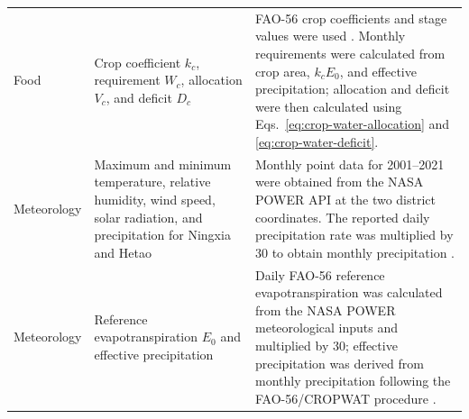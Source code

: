 \documentclass [a4paper,fleqn] {cas-dc}
\begin{document}
\begin{xltabular}{\textwidth}{@{}>{\raggedright\arraybackslash}p{0.09\textwidth}
  >{\raggedright\arraybackslash}p{0.24\textwidth}
  >{\raggedright\arraybackslash}X@{}}
Food & Crop coefficient $k_c$, requirement $W_c$, allocation $V_c$, and deficit
$D_c$ & FAO-56 crop coefficients and stage values were used
\citep{Allen1998FAO56}. Monthly requirements were calculated from crop area,
$k_c E_0$, and effective precipitation; allocation and deficit were then
calculated using Eqs.~\eqref{eq:crop-water-allocation} and
\eqref{eq:crop-water-deficit}. \\

Meteorology & Maximum and minimum temperature, relative humidity, wind speed,
solar radiation, and precipitation for Ningxia and Hetao & Monthly point data
for 2001--2021 were obtained from the NASA POWER API at the two district
coordinates. The reported daily precipitation rate was multiplied by 30 to
obtain monthly precipitation \citep{NASAPOWER}. \\

Meteorology & Reference evapotranspiration $E_0$ and effective precipitation
& Daily FAO-56 reference evapotranspiration was calculated from the NASA POWER
meteorological inputs and multiplied by 30; effective precipitation was derived
from monthly precipitation following the FAO-56/CROPWAT procedure
\citep{Allen1998FAO56,FAOCROPWAT,NASAPOWER}. \\
\end{xltabular}
\endgroup

\setlength{\multicolsep}{6pt plus 1pt minus 1pt}
\begin{multicols}{2}
\renewcommand{\bibfont}{\fontsize{8pt}{9.5pt}\selectfont}


\end{multicols}

\end{document}
